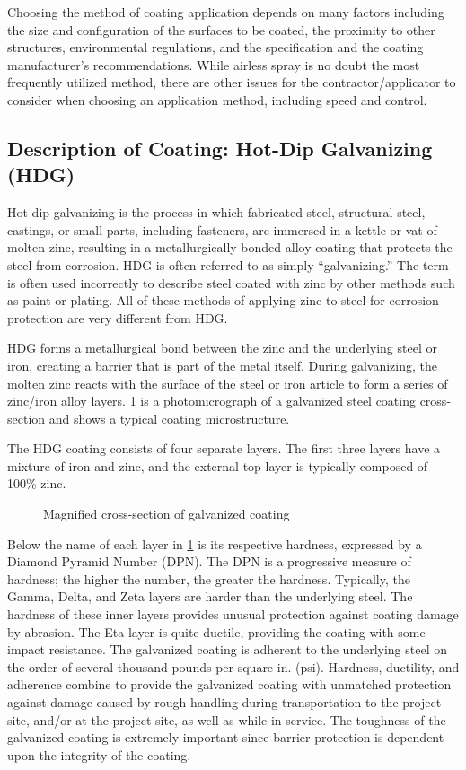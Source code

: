 Choosing the method of coating application depends on many factors including the size and configuration of the
surfaces to be coated, the proximity to other structures, environmental regulations, and the specification and the coating manufacturer’s recommendations. While airless spray is no doubt the most frequently utilized method, there
are other issues for the contractor/applicator to consider when choosing an application method, including speed and
control.

\subsection{Description of Coating: Hot-Dip Galvanizing (HDG)}
Hot-dip galvanizing is the process in which fabricated steel, structural steel, castings, or small parts, including
fasteners, are immersed in a kettle or vat of molten zinc, resulting in a metallurgically-bonded alloy coating that
protects the steel from corrosion. HDG is often referred to as simply “galvanizing.” The term is often used
incorrectly to describe steel coated with zinc by other methods such as paint or plating. All of these methods of
applying zinc to steel for corrosion protection are very different from HDG.

HDG forms a metallurgical bond between the zinc and the underlying steel or iron, creating a barrier that is part
of the metal itself. During galvanizing, the molten zinc reacts with the surface of the steel or iron article to form a
series of zinc/iron alloy layers. \cref{fig:cross-section-galvanized-coating} is a photomicrograph of a galvanized steel coating cross-section and
shows a typical coating microstructure.

The HDG coating consists of four separate layers. The first three layers have a mixture of iron and zinc, and the
external top layer is typically composed of 100\% zinc.

\begin{figure}
  \caption{Magnified cross-section of galvanized coating}\label{fig:cross-section-galvanized-coating}
\end{figure}

Below the name of each layer in \cref{fig:cross-section-galvanized-coating} is its respective hardness, expressed by a Diamond Pyramid Number
(DPN). The DPN is a progressive measure of hardness; the higher the number, the greater the hardness. Typically, the Gamma, Delta, and Zeta layers are harder than the underlying steel. The hardness of these inner layers provides
unusual protection against coating damage by abrasion. The Eta layer is quite ductile, providing the coating with
some impact resistance. The galvanized coating is adherent to the underlying steel on the order of several thousand
pounds per square in. (psi). Hardness, ductility, and adherence combine to provide the galvanized coating with
unmatched protection against damage caused by rough handling during transportation to the project site, and/or at the
project site, as well as while in service. The toughness of the galvanized coating is extremely important since barrier
protection is dependent upon the integrity of the coating.

